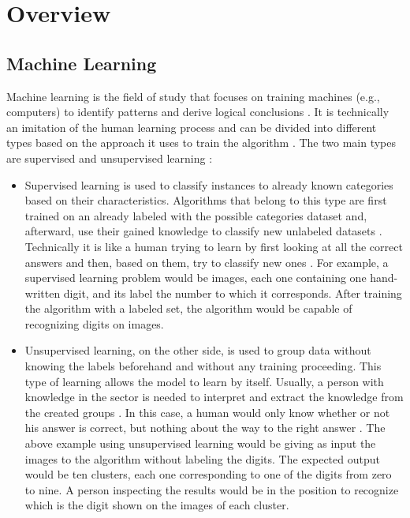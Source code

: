\section{Overview}

\subsection{Machine Learning}
Machine learning is the field of study that focuses on training machines (e.g., computers) to identify patterns and derive logical conclusions \autocite{machDef}. It is technically an imitation of the human learning process and can be divided into different types based on the approach it uses to train the algorithm \autocite[5]{chapman}. The two main types are supervised and unsupervised learning \autocite[43]{dunham}: \\
\begin{itemize}
\item Supervised learning is used to classify instances to already known categories based on their characteristics. Algorithms that belong to this type are first trained on an already labeled with the possible categories dataset and, afterward, use their gained knowledge to classify new unlabeled datasets \autocite[24]{han}. Technically it is like a human trying to learn by first looking at all the correct answers and then, based on them, try to classify new ones \autocite[5]{chapman}. For example, a supervised learning problem would be images, each one containing one hand-written digit, and its label the number to which it corresponds. After training the algorithm with a labeled set, the algorithm would be capable of recognizing digits on images. \\
\item Unsupervised learning, on the other side, is used to group data without knowing the labels beforehand and without any training proceeding. This type of learning allows the model to learn by itself. Usually, a person with knowledge in the sector is needed to interpret and extract the knowledge from the created groups \autocite[25]{han}. In this case, a human would only know whether or not his answer is correct, but nothing about the way to the right answer \autocite[5]{chapman}. The above example using unsupervised learning would be giving as input the images to the algorithm without labeling the digits. The expected output would be ten clusters, each one corresponding to one of the digits from zero to nine. A person inspecting the results would be in the position to recognize which is the digit shown on the images of each cluster. \\
\end{itemize}
